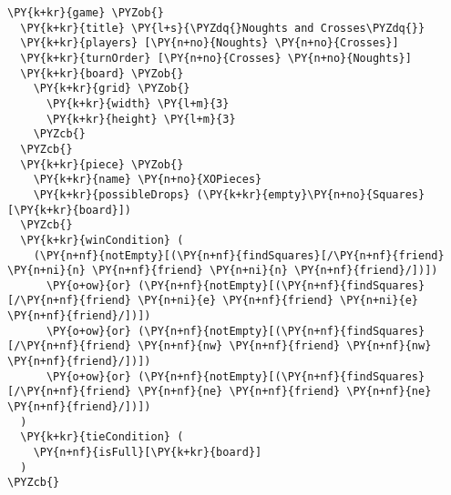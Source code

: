 \begin{Verbatim}[commandchars=\\\{\}]
\PY{k+kr}{game} \PYZob{}
  \PY{k+kr}{title} \PY{l+s}{\PYZdq{}Noughts and Crosses\PYZdq{}}
  \PY{k+kr}{players} [\PY{n+no}{Noughts} \PY{n+no}{Crosses}]
  \PY{k+kr}{turnOrder} [\PY{n+no}{Crosses} \PY{n+no}{Noughts}]
  \PY{k+kr}{board} \PYZob{}
    \PY{k+kr}{grid} \PYZob{}
      \PY{k+kr}{width} \PY{l+m}{3}
      \PY{k+kr}{height} \PY{l+m}{3}
    \PYZcb{}
  \PYZcb{}
  \PY{k+kr}{piece} \PYZob{}
    \PY{k+kr}{name} \PY{n+no}{XOPieces}
    \PY{k+kr}{possibleDrops} (\PY{k+kr}{empty}\PY{n+no}{Squares}[\PY{k+kr}{board}])
  \PYZcb{}
  \PY{k+kr}{winCondition} (
    (\PY{n+nf}{notEmpty}[(\PY{n+nf}{findSquares}[/\PY{n+nf}{friend} \PY{n+ni}{n} \PY{n+nf}{friend} \PY{n+ni}{n} \PY{n+nf}{friend}/])])
      \PY{o+ow}{or} (\PY{n+nf}{notEmpty}[(\PY{n+nf}{findSquares}[/\PY{n+nf}{friend} \PY{n+ni}{e} \PY{n+nf}{friend} \PY{n+ni}{e} \PY{n+nf}{friend}/])])
      \PY{o+ow}{or} (\PY{n+nf}{notEmpty}[(\PY{n+nf}{findSquares}[/\PY{n+nf}{friend} \PY{n+nf}{nw} \PY{n+nf}{friend} \PY{n+nf}{nw} \PY{n+nf}{friend}/])])
      \PY{o+ow}{or} (\PY{n+nf}{notEmpty}[(\PY{n+nf}{findSquares}[/\PY{n+nf}{friend} \PY{n+nf}{ne} \PY{n+nf}{friend} \PY{n+nf}{ne} \PY{n+nf}{friend}/])])
  )
  \PY{k+kr}{tieCondition} (
    \PY{n+nf}{isFull}[\PY{k+kr}{board}]
  )
\PYZcb{}
\end{Verbatim}
